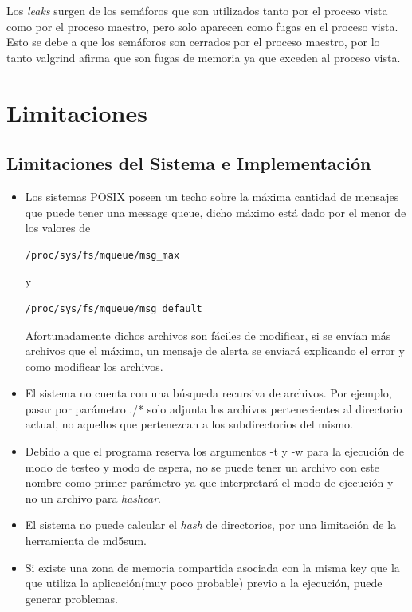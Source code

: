 \documentclass[10pt,a4paper]{report}
\begin{document}
Los \textit{leaks} surgen de los semáforos que son utilizados tanto por el proceso vista como por el proceso maestro, pero solo aparecen como fugas en el proceso vista. Esto se debe a que los semáforos son cerrados por el proceso maestro, por lo tanto valgrind afirma que son fugas de memoria ya que exceden al proceso vista. 


\chapter{Limitaciones}
\section{Limitaciones del Sistema e Implementación}

\begin{itemize}
\item Los sistemas POSIX poseen un techo sobre la máxima cantidad de mensajes que 
puede tener una message queue, dicho máximo está dado por el menor de los valores de \begin{verbatim}/proc/sys/fs/mqueue/msg_max
\end{verbatim}
 y \begin{verbatim}/proc/sys/fs/mqueue/msg_default 
\end{verbatim}
Afortunadamente dichos archivos son fáciles de modificar, si se envían más archivos que el máximo, un mensaje de alerta se enviará explicando el error y como modificar los archivos. 
\item  El sistema no cuenta con una búsqueda recursiva de archivos. Por ejemplo, pasar por parámetro ./* solo adjunta los archivos pertenecientes al directorio actual, no aquellos que pertenezcan a los subdirectorios del mismo.

\item Debido a que el programa reserva los argumentos -t y -w para la ejecución de modo de testeo y modo de espera, no se puede tener un archivo con este nombre como primer parámetro ya que interpretará el modo de ejecución y no un archivo para \textit{hashear}.

\item El sistema no puede calcular el \textit{hash} de directorios, por una limitación de la herramienta de md5sum.

\item Si existe una zona de memoria compartida asociada con la misma key que la que utiliza la aplicación(muy poco probable) previo a la ejecución, puede generar problemas.
\end{itemize}
\end{document}
